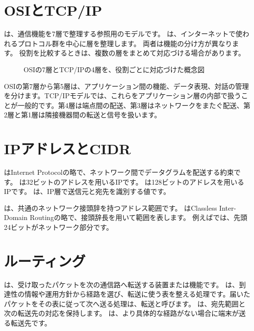 \section{OSIとTCP/IP}

は、通信機能を7層で整理する参照用のモデルです。
は、インターネットで使われるプロトコル群を中心に層を整理します。
両者は機能の分け方が異なります。
役割を比較するときは、複数の層をまとめて対応づける場合があります。

\begin{figure}[htbp]
  \centering
  \caption{OSIの7層とTCP/IPの4層を、役割ごとに対応づけた概念図}
  \label{fig:osi-tcpip-models}
\end{figure}

OSIの第7層から第5層は、アプリケーション間の機能、データ表現、対話の管理を分けます。TCP/IPモデルでは、これらをアプリケーション層の内部で扱うことが一般的です。第4層は端点間の配送、第3層はネットワークをまたぐ配送、第2層と第1層は隣接機器間の転送と信号を扱います。


\section{IPアドレスとCIDR}

はInternet Protocolの略で、ネットワーク間でデータグラムを配送する約束です。
は32ビットのアドレスを用いるIPです。
は128ビットのアドレスを用いるIPです。
は、IP層で送信元と宛先を識別する値です。

は、共通のネットワーク接頭辞を持つアドレス範囲です。
はClassless Inter-Domain Routingの略で、接頭辞長を用いて範囲を表します。
例えばでは、先頭24ビットがネットワーク部分です。

\section{ルーティング}

は、受け取ったパケットを次の通信路へ転送する装置または機能です。
は、到達性の情報や運用方針から経路を選び、転送に使う表を整える処理です。届いたパケットをその表に従って次へ送る処理は、転送と呼びます。
は、宛先範囲と次の転送先の対応を保持します。
は、より具体的な経路がない場合に端末が送る転送先です。

